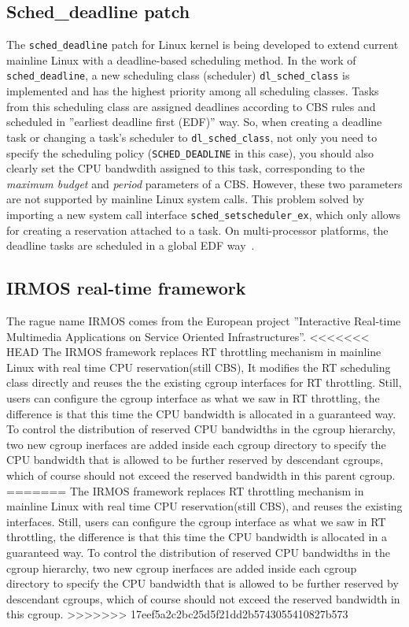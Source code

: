 \subsection{Sched\_deadline patch\label{sec:RelatedWork_dl}}
The \texttt{sched\_deadline} patch for Linux kernel is being developed 
to extend current mainline Linux with a deadline-based scheduling method. 
In the work of \texttt{sched\_deadline}, a new scheduling class (scheduler) 
\texttt{dl\_sched\_class} is implemented and has the highest priority among 
all scheduling classes. Tasks from this scheduling class are assigned 
deadlines according to CBS rules and scheduled in ''earliest deadline first
(EDF)'' way. So, when creating a deadline task or changing a task's scheduler
to \texttt{dl\_sched\_class}, not only you need to specify the scheduling
policy (\texttt{SCHED\_DEADLINE} in this case), you should also clearly
set the CPU bandwdith assigned to this task, corresponding to the
\emph{maximum budget} and \emph{period} parameters of a CBS. However,
these two parameters are not supported by mainline Linux system calls.
This problem solved by importing a new system call interface 
\texttt{sched\_setscheduler\_ex}, which only allows for creating a 
reservation attached to a task. On multi-processor platforms, the 
deadline tasks are scheduled in a global EDF way~\cite{J.Lelli}.

\subsection{IRMOS real-time framework\label{sec:RelatedWork_irmos}}
The rague name IRMOS comes from the European project ''Interactive 
Real-time Multimedia Applications on Service Oriented Infrastructures''. 
<<<<<<< HEAD
The IRMOS framework replaces RT throttling mechanism in mainline Linux 
with real time CPU reservation(still CBS), It modifies the RT scheduling 
class directly and reuses the the existing cgroup interfaces for RT 
throttling. Still, users can configure the cgroup interface as what we saw 
in RT throttling, the difference is that this time 
the CPU bandwidth is allocated in a guaranteed way. To control the distribution 
of reserved CPU bandwidths in the cgroup hierarchy, two new cgroup inerfaces
are added inside each cgroup directory to specify the CPU bandwidth that 
is allowed to be further reserved by descendant cgroups, which of course 
should not exceed the reserved bandwidth in this parent cgroup.
=======
The IRMOS framework replaces RT throttling mechanism in mainline Linux with 
real time CPU reservation(still CBS), and reuses the existing interfaces. 
Still, users can configure the cgroup interface as what we saw in RT 
throttling, the difference is that this time the CPU 
bandwidth is allocated in a guaranteed way. To control the distribution of 
reserved CPU bandwidths in the cgroup hierarchy, two new cgroup inerfaces
are added inside each cgroup directory to specify the CPU bandwidth that 
is allowed to be further reserved by descendant cgroups, which of course 
should not exceed the reserved bandwidth in this cgroup.
>>>>>>> 17eef5a2c2bc25d5f21dd2b5743055410827b573

